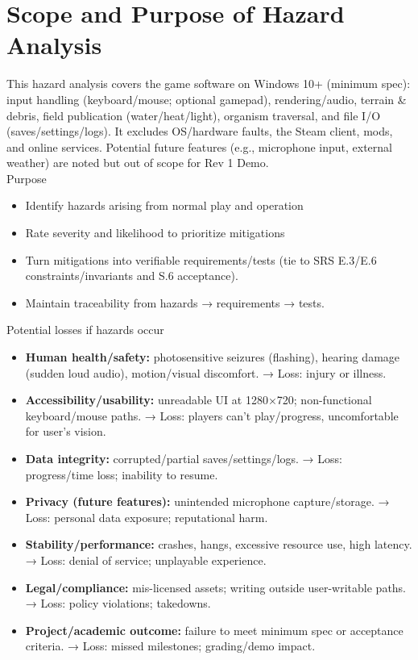 \documentclass{article}
\begin{document}
\section{Scope and Purpose of Hazard Analysis}

This hazard analysis covers the game software on Windows 10+ (minimum spec): input handling (keyboard/mouse; optional gamepad), rendering/audio, terrain \& debris, field publication (water/heat/light), organism traversal, and file I/O (saves/settings/logs). It excludes OS/hardware faults, the Steam client, mods, and online services. Potential future features (e.g., microphone input, external weather) are noted but out of scope for Rev 1 Demo.\\

Purpose
\begin{itemize}
\item{Identify hazards arising from normal play and operation}
\item{Rate severity and likelihood to prioritize mitigations}
\item{Turn mitigations into verifiable requirements/tests (tie to SRS E.3/E.6 constraints/invariants and S.6 acceptance).}
\item{Maintain traceability from hazards → requirements → tests.}
\end{itemize}

Potential losses if hazards occur
\begin{itemize}
\item{\textbf{Human health/safety:} photosensitive seizures (flashing), hearing damage (sudden loud audio), motion/visual discomfort. → Loss: injury or illness.}
\item{\textbf{Accessibility/usability:} unreadable UI at 1280×720; non-functional keyboard/mouse paths. → Loss: players can’t play/progress, uncomfortable for user's vision.}
\item{\textbf{Data integrity:} corrupted/partial saves/settings/logs. → Loss: progress/time loss; inability to resume.}
\item{\textbf{Privacy (future features):} unintended microphone capture/storage. → Loss: personal data exposure; reputational harm.}
\item{\textbf{Stability/performance:} crashes, hangs, excessive resource use, high latency. → Loss: denial of service; unplayable experience.}
\item{\textbf{Legal/compliance:} mis-licensed assets; writing outside user-writable paths. → Loss: policy violations; takedowns.}
\item{\textbf{Project/academic outcome:} failure to meet minimum spec or acceptance criteria. → Loss: missed milestones; grading/demo impact.}
\end{itemize}
\end{document}
